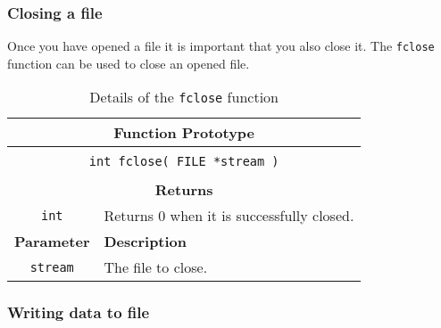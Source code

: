 

\clearpage
\subsubsection{Closing a file} %
\label{ssub:closing_a_file}

Once you have opened a file it is important that you also close it. The \texttt{fclose} function can be used to close an opened file.

\begin{table}[h]
  \centering
  \begin{tabular}{|c|p{9.5cm}|}
    \hline
    \multicolumn{2}{|c|}{\textbf{Function Prototype}} \\
    \hline
    \multicolumn{2}{|c|}{} \\
    \multicolumn{2}{|c|}{\texttt{int fclose( FILE *stream )}} \\
    \multicolumn{2}{|c|}{} \\
    \hline
    \multicolumn{2}{|c|}{\textbf{Returns}} \\
    \hline
    \texttt{int} & Returns 0 when it is successfully closed. \\
    \hline
    \textbf{Parameter} & \textbf{Description} \\
    \hline
    \texttt{ stream } & The file to close. \\
    \hline
  \end{tabular}
  \caption{Details of the \texttt{fclose} function}
  \label{tbl:fclose}
\end{table}



\subsubsection{Writing data to file} %
\label{ssub:writing_data_to_file}

